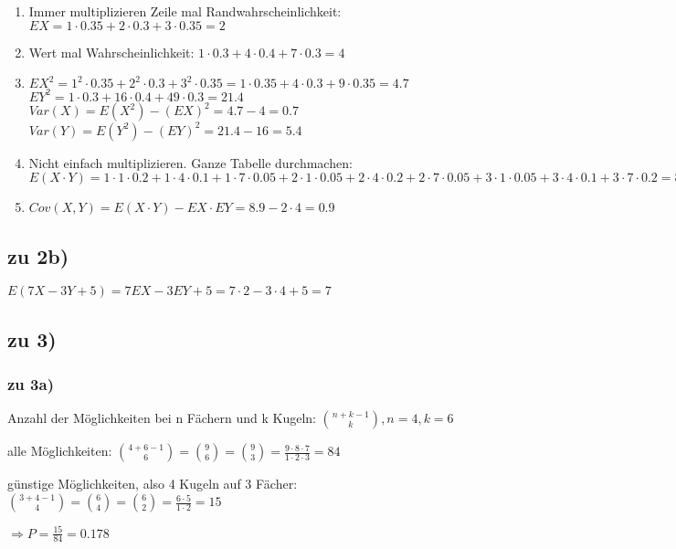 \begin{enumerate}
\item Immer multiplizieren Zeile mal Randwahrscheinlichkeit: $ EX = 1\cdot 0.35 + 2\cdot 0.3 + 3\cdot 0.35 = 2$
\item Wert mal Wahrscheinlichkeit: $ 1\cdot 0.3 + 4\cdot 0.4 + 7\cdot 0.3 = 4$
\item $EX^2 = 1^2 \cdot 0.35 + 2^2\cdot 0.3 + 3^2\cdot 0.35 = 1\cdot 0.35 + 4\cdot 0.3 + 9\cdot 0.35 = 4.7$\\
$EY^2 = 1\cdot 0.3 + 16\cdot 0.4 + 49\cdot 0.3 = 21.4 $\\
$Var(X) = E(X^2) - (EX)^2 = 4.7 - 4 = 0.7$\\
$Var(Y) = E(Y^2) - (EY)^2 = 21.4 - 16 = 5.4$\\
\item Nicht einfach multiplizieren. Ganze Tabelle durchmachen: $ E(X\cdot Y) = 
1\cdot 1\cdot 0.2 + 
1\cdot 4\cdot 0.1 + 
1\cdot 7\cdot 0.05 + 
2\cdot 1\cdot 0.05 + 
2\cdot 4\cdot 0.2 + 
2\cdot 7\cdot 0.05 + 
3\cdot 1\cdot 0.05 + 
3\cdot 4\cdot 0.1 + 
3\cdot 7\cdot 0.2 = 8.9
$
\item $ Cov(X,Y) = E(X\cdot Y) - EX\cdot EY = 8.9 - 2 \cdot 4 = 0.9$
\end{enumerate}

\subsection{zu 2b)}
$ E(7X - 3Y + 5) = 7 EX - 3 EY + 5 = 7\cdot 2 - 3\cdot 4 + 5 = 7$

\subsection{zu 3)}

\subsubsection{zu 3a)}
Anzahl der Möglichkeiten bei n Fächern und k Kugeln: 
$ \binom{n+k-1}{k}, n=4, k=6 $

alle Möglichkeiten: $ \binom{4+6-1}{6} = \binom 9 6 = \binom 9 3 = \frac{9\cdot 8\cdot 7}{1\cdot 2\cdot 3} = 84$

günstige Möglichkeiten, also 4 Kugeln auf 3 Fächer: $ \binom{3+4-1}{4} = \binom 6 4 = \binom 6 2 = \frac{6\cdot 5}{1\cdot 2} = 15$

$\Rightarrow P = \frac{15}{84} = 0.178 $

